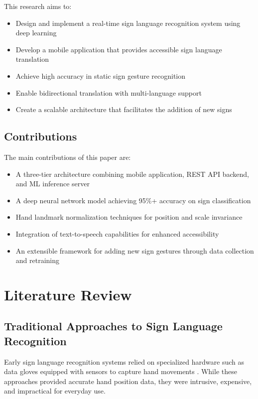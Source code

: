 \documentclass[conference]{IEEEtran}
\begin{document}
This research aims to:

\begin{itemize}
    \item Design and implement a real-time sign language recognition system using deep learning
    \item Develop a mobile application that provides accessible sign language translation
    \item Achieve high accuracy in static sign gesture recognition
    \item Enable bidirectional translation with multi-language support
    \item Create a scalable architecture that facilitates the addition of new signs
\end{itemize}

\subsection{Contributions}

The main contributions of this paper are:

\begin{itemize}
    \item A three-tier architecture combining mobile application, REST API backend, and ML inference server
    \item A deep neural network model achieving 95\%+ accuracy on sign classification
    \item Hand landmark normalization techniques for position and scale invariance
    \item Integration of text-to-speech capabilities for enhanced accessibility
    \item An extensible framework for adding new sign gestures through data collection and retraining
\end{itemize}

\section{Literature Review}

\subsection{Traditional Approaches to Sign Language Recognition}

Early sign language recognition systems relied on specialized hardware such as data gloves equipped with sensors to capture hand movements \cite{starner1995}. While these approaches provided accurate hand position data, they were intrusive, expensive, and impractical for everyday use.
\end{document}
